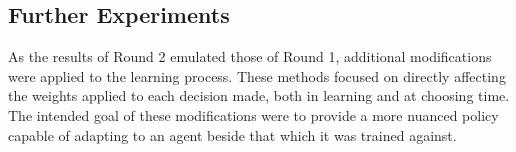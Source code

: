 

\subsection{Further Experiments}
\label{sec:findings-expts}

As the results of Round 2 emulated those of Round 1,
additional modifications were applied to the learning process.
%
These methods focused on directly affecting the weights applied to each
decision made,
both in learning and at choosing time.
%
The intended goal of these modifications were to provide a more nuanced policy
capable of adapting to an agent beside that which it was trained against.
















